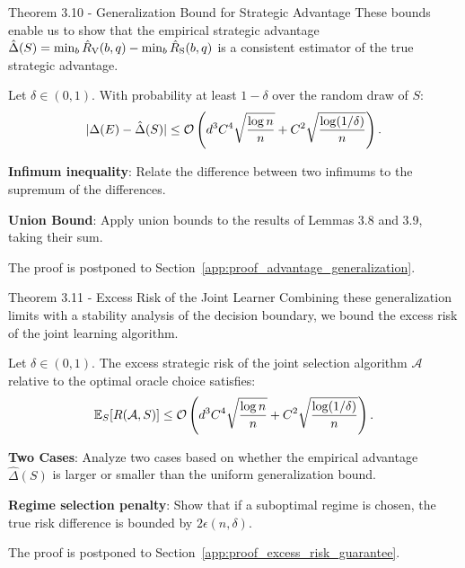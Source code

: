 \begin{sourceblock}{Theorem 3.10 - Generalization Bound for Strategic Advantage}
These bounds enable us to show that the empirical strategic advantage $\hat{\Delta}(S) = \min_{b} \hat{R}_{\mathrm{V}}(b, q) - \min_{b} \hat{R}_{\mathrm{S}}(b, q)$ is a consistent estimator of the true strategic advantage.
\begin{theorem}
\label{thm:advantage_generalization}
Let $\delta \in (0, 1)$. With probability at least $1 - \delta$ over the random draw of $S$:
\begin{equation}
    \label{eq:advantage_gen_bound}
    |\Delta(E) - \hat{\Delta}(S)| \le \mathcal{O}\left( d^3 C^4 \sqrt{\frac{\log n}{n}} + C^2 \sqrt{\frac{\log(1/\delta)}{n}} \right).
\end{equation}
\end{theorem}
\end{sourceblock}

\begin{guideblock}
\item \textbf{Infimum inequality}: Relate the difference between two infimums to the supremum of the differences.
\item \textbf{Union Bound}: Apply union bounds to the results of Lemmas 3.8 and 3.9, taking their sum.
\end{guideblock}
The proof is postponed to Section~\ref{app:proof_advantage_generalization}.

\begin{sourceblock}{Theorem 3.11 - Excess Risk of the Joint Learner}
Combining these generalization limits with a stability analysis of the decision boundary, we bound the excess risk of the joint learning algorithm.
\begin{theorem}
\label{thm:excess_risk_guarantee}
Let $\delta \in (0, 1)$. The excess strategic risk of the joint selection algorithm $\mathcal{A}$ relative to the optimal oracle choice satisfies:
\begin{equation}
    \label{eq:excess_risk_bound}
    \mathbb{E}_S[R(\mathcal{A}, S)] \le \mathcal{O}\left( d^3 C^4 \sqrt{\frac{\log n}{n}} + C^2 \sqrt{\frac{\log(1/\delta)}{n}} \right).
\end{equation}
\end{theorem}
\end{sourceblock}

\begin{guideblock}
\item \textbf{Two Cases}: Analyze two cases based on whether the empirical advantage $\hat{\Delta}(S)$ is larger or smaller than the uniform generalization bound.
\item \textbf{Regime selection penalty}: Show that if a suboptimal regime is chosen, the true risk difference is bounded by $2\epsilon(n, \delta)$.
\end{guideblock}
The proof is postponed to Section~\ref{app:proof_excess_risk_guarantee}.

